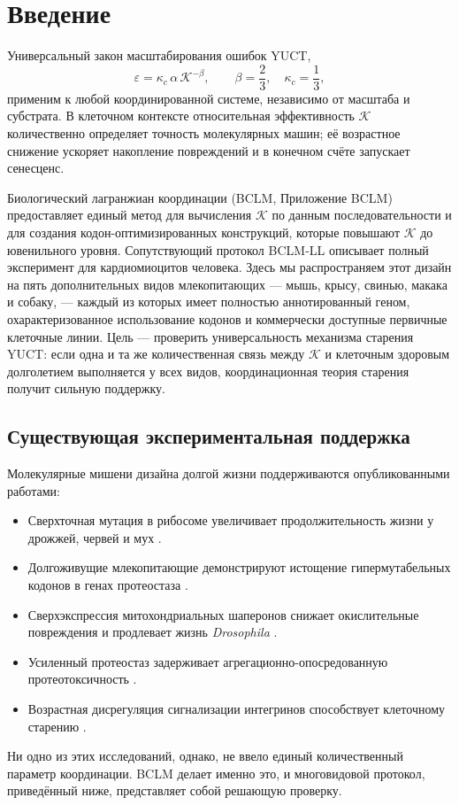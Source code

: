 \documentclass[12pt,a4paper]{article}
\newcommand{\REL}{\mathcal{K}}          %
\begin{document}
	\tableofcontents
	\newpage
	
	\section{Введение}
	\label{sec:intro}
	Универсальный закон масштабирования ошибок YUCT,
	\begin{equation}
		\varepsilon = \kappa_c \, \alpha \, \REL^{-\beta}, \qquad \beta = \frac{2}{3},\quad \kappa_c = \frac{1}{3},
		\label{eq:error-law}
	\end{equation}
	применим к любой координированной системе, независимо от масштаба и субстрата. В клеточном контексте относительная эффективность \(\REL\) количественно определяет точность молекулярных машин; её возрастное снижение ускоряет накопление повреждений и в конечном счёте запускает сенесценс.
	
	Биологический лагранжиан координации (BCLM, Приложение BCLM) предоставляет единый метод для вычисления \(\REL\) по данным последовательности и для создания кодон-оптимизированных конструкций, которые повышают \(\REL\) до ювенильного уровня. Сопутствующий протокол BCLM‑LL описывает полный эксперимент для кардиомиоцитов человека. Здесь мы распространяем этот дизайн на пять дополнительных видов млекопитающих — мышь, крысу, свинью, макака и собаку, — каждый из которых имеет полностью аннотированный геном, охарактеризованное использование кодонов и коммерчески доступные первичные клеточные линии. Цель — проверить универсальность механизма старения YUCT: если одна и та же количественная связь между \(\REL\) и клеточным здоровым долголетием выполняется у всех видов, координационная теория старения получит сильную поддержку.
	
	\subsection{Существующая экспериментальная поддержка}
	Молекулярные мишени дизайна долгой жизни поддерживаются опубликованными работами:
	\begin{itemize}
		\item Сверхточная мутация в рибосоме увеличивает продолжительность жизни у дрожжей, червей и мух \cite{Bjedov2021}.
		\item Долгоживущие млекопитающие демонстрируют истощение гипермутабельных кодонов в генах протеостаза \cite{Kerekes2025}.
		\item Сверхэкспрессия митохондриальных шаперонов снижает окислительные повреждения и продлевает жизнь \textit{Drosophila} \cite{Morrow2004}.
		\item Усиленный протеостаз задерживает агрегационно-опосредованную протеотоксичность \cite{Walker2003}.
		\item Возрастная дисрегуляция сигнализации интегринов способствует клеточному старению \cite{Takeda2019}.
	\end{itemize}
	Ни одно из этих исследований, однако, не ввело единый количественный параметр координации. BCLM делает именно это, и многовидовой протокол, приведённый ниже, представляет собой решающую проверку.
	
\end{document}
